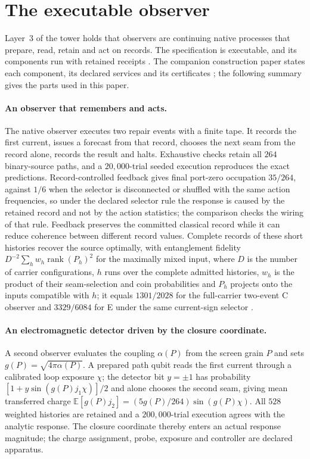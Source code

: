 \documentclass[11pt]{article}
\theoremstyle{definition}
\theoremstyle{remark}
\begin{document}
\section{The executable observer}
\label{sec:observer-runs}

Layer~3 of the tower holds that observers are continuing native processes
that prepare, read, retain and act on records.
The specification is executable, and its components run with retained
receipts \cite{ophmodel}. The companion construction paper states each
component, its declared services and its certificates \cite{ophspine}; the
following summary gives the parts used in this paper.

\paragraph{An observer that remembers and acts.} The native observer
executes two repair events with a finite tape. It records the first current,
issues a forecast from that record, chooses the next seam from the record
alone, records the result and halts. Exhaustive checks retain all $264$
binary-source paths, and a $20{,}000$-trial seeded execution reproduces the
exact predictions. Record-controlled feedback gives final port-zero
occupation $35/264$, against $1/6$ when the selector is disconnected or
shuffled with the same action frequencies, so under the declared selector rule
the response is caused by the retained record and not by the action
statistics; the comparison checks the wiring of that rule. Feedback preserves the
committed classical record while it can reduce coherence between different
record values. Complete records of these short histories recover the source optimally, with entanglement fidelity $D^{-2}\sum_hw_h\operatorname{rank}(P_h)^2$ for the maximally mixed input, where $D$ is the number of carrier configurations, $h$ runs over the complete admitted histories, $w_h$ is the product of their seam-selection and coin probabilities and $P_h$ projects onto the inputs compatible with $h$; it equals $1301/2028$ for the full-carrier two-event C observer and $3329/6084$
for E under the same current-sign selector
\cite{ophrecovery}.

\paragraph{An electromagnetic detector driven by the closure coordinate.}
A second observer evaluates the coupling $\alpha(P)$ from the screen grain
$P$ and sets $g(P)=\sqrt{4\pi\alpha(P)}$. A prepared path qubit reads the
first current through a calibrated loop exposure $\chi$; the detector bit
$y=\pm1$ has probability $[1+y\sin(g(P)j_1\chi)]/2$ and alone chooses the
second seam, giving mean transferred charge
$\mathbb E[g(P)j_2]=(5g(P)/264)\sin(g(P)\chi)$. All
$528$ weighted histories are retained and a $200{,}000$-trial execution
agrees with the analytic response. The closure coordinate thereby enters an
actual response magnitude; the charge assignment, probe, exposure and
controller are declared apparatus.
\end{document}
